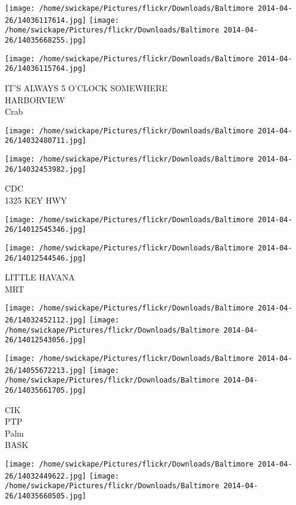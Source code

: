 \documentclass[10pt,letterpaper]{article}
\begin{document}
\texttt{[image: /home/swickape/Pictures/flickr/Downloads/Baltimore 2014-04-26/14036117614.jpg]}
\texttt{[image: /home/swickape/Pictures/flickr/Downloads/Baltimore 2014-04-26/14035668255.jpg]}

\texttt{[image: /home/swickape/Pictures/flickr/Downloads/Baltimore 2014-04-26/14036115764.jpg]}

IT'S ALWAYS 5 O'CLOCK SOMEWHERE\\
HARBORVIEW\\
Crab\\
\pagebreak

\texttt{[image: /home/swickape/Pictures/flickr/Downloads/Baltimore 2014-04-26/14032480711.jpg]}

\vspace{0.25in}
\texttt{[image: /home/swickape/Pictures/flickr/Downloads/Baltimore 2014-04-26/14032453982.jpg]}

CDC\\
1325 KEY HWY\\
\pagebreak

\texttt{[image: /home/swickape/Pictures/flickr/Downloads/Baltimore 2014-04-26/14012545346.jpg]}

\vspace{0.25in}
\texttt{[image: /home/swickape/Pictures/flickr/Downloads/Baltimore 2014-04-26/14012544546.jpg]}

LITTLE HAVANA\\
MRT\\
\pagebreak

\texttt{[image: /home/swickape/Pictures/flickr/Downloads/Baltimore 2014-04-26/14032452112.jpg]}
\texttt{[image: /home/swickape/Pictures/flickr/Downloads/Baltimore 2014-04-26/14012543056.jpg]}

\texttt{[image: /home/swickape/Pictures/flickr/Downloads/Baltimore 2014-04-26/14055672213.jpg]}
\texttt{[image: /home/swickape/Pictures/flickr/Downloads/Baltimore 2014-04-26/14035661705.jpg]}

CIK\\
PTP\\
Palm\\
BASK\\
\pagebreak

\texttt{[image: /home/swickape/Pictures/flickr/Downloads/Baltimore 2014-04-26/14032449622.jpg]}
\texttt{[image: /home/swickape/Pictures/flickr/Downloads/Baltimore 2014-04-26/14035660505.jpg]}
\end{document}
